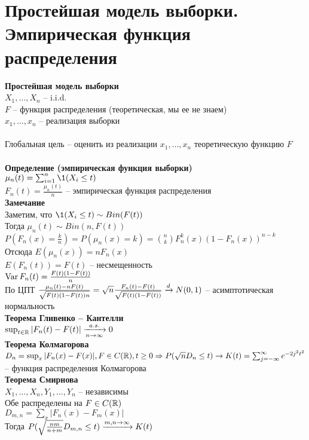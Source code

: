 \documentclass[12pt]{article}
\begin{document}
\section{Простейшая модель выборки. Эмпирическая функция распределения}
\textbf{Простейшая модель выборки}\\
$X_1, \ldots, X_n$ -- i.i.d.\\
$F$ -- функция распределения (теоретическая, мы ее не знаем)\\
$x_1, \ldots, x_n$ -- реализация выборки\\\\
Глобальная цель -- оценить из реализации $x_1, \ldots, x_n$ теоретическую функцию $F$\\\\
\textbf{Определение (эмпирическая функция выборки)}\\
$\mu_n(t) = \sum_{i=1}^n \1(X_i \leq t)$\\
$F_n(t) = \frac{\mu_n(t)}{n}$ -- эмпирическая функция распределения\\
\textbf{Замечание}\\
Заметим, что $\1(X_i \leq t) \sim Bin(F(t))$\\
Тогда $\mu_n(t) \sim Bin(n, F(t))$\\
$P(F_n(x) = \frac kn) = P(\mu_n(x) = k) = \binom{n}{k} F_n^k(x) (1-F_n(x))^{n-k}$\\ 
Отсюда $E(\mu_n(x)) = n F_n(x)$\\
$E(F_n(t)) = F(t)$ -- несмещенность\\
$\operatorname{Var} F_n(t) = \frac{F(t)(1-F(t))}{n}$\\
По ЦПТ $\frac{\mu_n(t) - n F(t)}{\sqrt{F(t)(1-F(t))n}} = \sqrt{n} \frac{F_n(t) - F(t)}{\sqrt{F(t)(1-F(t))}} \xrightarrow{d} N(0,1)$ -- асимптотическая нормальность\\
\textbf{Теорема Гливенко -- Кантелли}\\
$\sup_{t \in \mathbb{R}} |F_n(t) - F(t)| \xrightarrow[n \rightarrow \infty]{a.s.} 0$\\
\textbf{Теорема Колмагорова}\\
$D_n = \sup_x |F_n(x) - F(x)|, F \in C(\mathbb{R}), t \geq 0 \Rightarrow P(\sqrt{n} D_n \leq t) \rightarrow K(t) = \sum_{j = -\infty}^\infty e^{-2j^2t^2}$ -- функция распределения Колмагорова\\
\textbf{Теорема Смирнова}\\
$X_1, \ldots, X_n, Y_1, \ldots, Y_n$ -- независимы\\
Обе распределены на $F \in C(\mathbb{R})$\\
$D_{m, n} = \sum_x |F_n(x) - F_m(x)|$\\
Тогда $P(\sqrt{\frac{nm}{n+m}} D_{m,n} \leq t) \xrightarrow[]{m,n \rightarrow \infty} K(t)$\\
\end{document}
